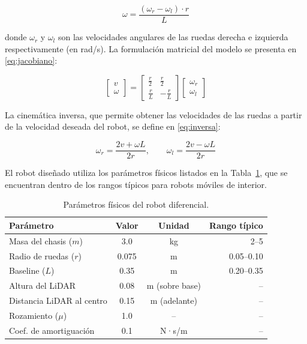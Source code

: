 \documentclass[12pt,letterpaper]{article}
\begin{document}
\begin{equation}
    \omega = \frac{(\omega_r - \omega_l) \cdot r}{L}
    \label{eq:directa_w}
\end{equation}

donde $\omega_r$ y $\omega_l$ son las velocidades angulares de las ruedas derecha e izquierda respectivamente (en rad/s). La formulación matricial del modelo se presenta en \eqref{eq:jacobiano}:

\begin{equation}
    \begin{bmatrix}
        v \\
        \omega
    \end{bmatrix}
    =
    \begin{bmatrix}
        \frac{r}{2} & \frac{r}{2} \\[6pt]
        \frac{r}{L} & -\frac{r}{L}
    \end{bmatrix}
    \begin{bmatrix}
        \omega_r \\
        \omega_l
    \end{bmatrix}
    \label{eq:jacobiano}
\end{equation}

La cinemática inversa, que permite obtener las velocidades de las ruedas a partir de la velocidad deseada del robot, se define en \eqref{eq:inversa}:

\begin{equation}
    \omega_r = \frac{2v + \omega L}{2r}, \qquad
    \omega_l = \frac{2v - \omega L}{2r}
    \label{eq:inversa}
\end{equation}

El robot diseñado utiliza los parámetros físicos listados en la Tabla~\ref{tab:param_fisicos}, que se encuentran dentro de los rangos típicos para robots móviles de interior.

\begin{table}[H]
    \centering
    \caption{Parámetros físicos del robot diferencial.}
    \label{tab:param_fisicos}
    \begin{tabular}{lccr}
        \hline
        \textbf{Parámetro} & \textbf{Valor} & \textbf{Unidad} & \textbf{Rango típico} \\
        \hline
        Masa del chasis ($m$) & 3.0 & kg & 2--5 \\
        Radio de ruedas ($r$) & 0.075 & m & 0.05--0.10 \\
        Baseline ($L$) & 0.35 & m & 0.20--0.35 \\
        Altura del LiDAR & 0.08 & m (sobre base) & -- \\
        Distancia LiDAR al centro & 0.15 & m (adelante) & -- \\
        Rozamiento ($\mu$) & 1.0 & -- & -- \\
        Coef. de amortiguación & 0.1 & N·s/m & -- \\
        \hline
    \end{tabular}
\end{table}
\end{document}
